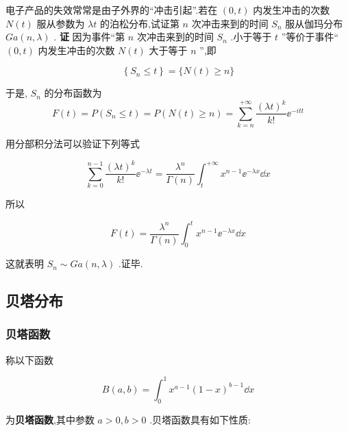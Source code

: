 \begin{example}\label{exam:2.5.6}
	电子产品的失效常常是由子外界的“冲击引起”.若在 $ (0,t) $ 内发生冲击的次数 $ N(t) $ 服从参数为 $ \lambda t $ 的泊松分布,试证第 $ n $ 次冲击来到的时间 $ S_{n} $ 服从伽玛分布 $ G a(n, \lambda) $ .
	\textbf{证} 因为事件“第 $ n $ 次冲击来到的时间 $ S_{n} $ .小于等于 $ t $ ”等价于事件“ $ (0,t) $ 
	内发生冲击的次数 $ N(t) $ 大于等于 $ n $ ”,即
	
	\[
	\left\{S_{n} \leqslant t\right\}=\{N(t) \geqslant n\}
	\]
	
	于是, $ S_{n} $ 的分布函数为
	\[
	F(t)=P\left(S_{n} \leqslant t\right)=P(N(t) \geqslant n)=\sum_{k=n}^{+\infty} \frac{(\lambda t)^{k}}{k !} \ee ^{-i t t}
	\]
	
	用分部积分法可以验证下列等式
	
	\begin{equation}
	\sum_{k=0}^{n-1} \frac{(\lambda t)^{k}}{k !} \ee ^{-\lambda t}=\frac{\lambda^{n}}{\Gamma(n)} \int_{t}^{+\infty} x^{n-1} \ee ^{-\lambda x} \dd x \label{eq:2.5.16}
	\end{equation}
	
	所以
	
	\[
	F(t)=\frac{\lambda^{n}}{\Gamma(n)} \int_{0}^{t} x^{n-1} \ee ^{-\lambda x} \dd x
	\]
	
	这就表明 $ S_{n} \sim G a(n, \lambda) $ .证毕.
\end{example}

\subsection{贝塔分布}\label{ssec:2.5.5}

\subsubsection{贝塔函数}

称以下函数

\begin{equation}
B(a, b)=\int_{0}^{1} x^{a-1}(1-x)^{b-1} \dd x \label{eq:2.5.17}
\end{equation}

为\textbf{贝塔函数},其中参数 $ a>0,b>0 $ .贝塔函数具有如下性质:

